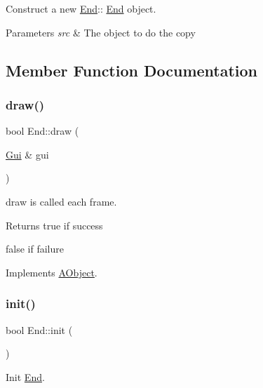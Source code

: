 Construct a new \hyperlink{class_end}{End}\+:\+: \hyperlink{class_end}{End} object. 


\begin{DoxyParams}{Parameters}
{\em src} & The object to do the copy \\
\hline
\end{DoxyParams}


\subsection{Member Function Documentation}
\mbox{\label{class_end_aad5c7ef71927eddfd634e0a0879cb99a}} 
\subsubsection{\texorpdfstring{draw()}{draw()}}
{\footnotesize\ttfamily bool End\+::draw (\begin{DoxyParamCaption}\item[{\hyperlink{class_gui}{Gui} \&}]{gui }\end{DoxyParamCaption})\hspace{0.3cm}{\ttfamily [virtual]}}



draw is called each frame. 

\begin{DoxyReturn}{Returns}
true if success 

false if failure 
\end{DoxyReturn}


Implements \hyperlink{class_a_object_a5e454e13e04ee937c20a465244cf748a}{A\+Object}.

\mbox{\label{class_end_a1c57c2279d61916ea97aed566e8b3663}} 
\subsubsection{\texorpdfstring{init()}{init()}}
{\footnotesize\ttfamily bool End\+::init (\begin{DoxyParamCaption}{ }\end{DoxyParamCaption})\hspace{0.3cm}{\ttfamily [virtual]}}



Init \hyperlink{class_end}{End}. 

